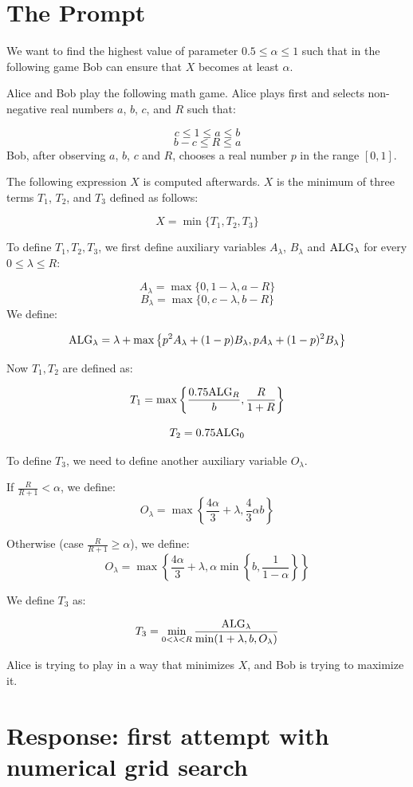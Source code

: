 \documentclass[11pt]{article}
\newcommand{\ALG}{\textnormal{ALG}}
\begin{document}
\section{The Prompt}
We want to find the highest value of parameter $0.5 \le \alpha \le 1$ such that in the following game Bob can ensure that $X$ becomes at least $\alpha$.

Alice and Bob play the following math game. Alice plays first and selects non-negative real numbers $a$, $b$, $c$, and $R$ such that:

$$c \le 1 \le a \le b$$
$$b-c \le R \le a$$
Bob, after observing $a$, $b$, $c$ and $R$, chooses a real number $p$ in the range $[0,1]$.

The following expression $X$ is computed afterwards. $X$ is the minimum of three terms $T_1$, $T_2$, and $T_3$ defined as follows:

$$X = \min\{T_1, T_2, T_3\}$$

To define $T_1, T_2, T_3$, we first define auxiliary variables $A_{\lambda}$, $B_{\lambda}$ and $\ALG_{\lambda}$ for every $0 \le \lambda \le R$:

$$A_{\lambda} = \max\{0, 1 - \lambda, a - R\}$$
$$B_{\lambda} = \max\{0, c - \lambda, b - R\}$$
We define:

$$\ALG_{\lambda} = \lambda + \max\left\{p^2A_{\lambda} + (1-p)B_{\lambda}, pA_{\lambda} + (1-p)^2B_{\lambda}\right\}$$

Now $T_1, T_2$ are defined as:


$$T_1 = \max\left\{\frac{0.75 \ALG_{R}}{b}, \frac{R}{1+R}\right\}$$

$$T_2 = 0.75 \ALG_{0}$$

To define $T_3$, we need to define another auxiliary variable $O_{\lambda}$.

If $\frac{R}{R+1} < \alpha$, we define:
$$O_{\lambda} = \max\left\{\frac{4 \alpha}{3} + \lambda, \frac{4}{3} \alpha b \right\}$$

Otherwise (case $\frac{R}{R+1} \ge \alpha$), we define:
$$O_{\lambda} = \max\left\{\frac{4 \alpha}{3} + \lambda, \alpha \min\left\{b, \frac{1}{1-\alpha} \right\} \right\}$$


We define $T_3$ as:

$$T_3 = \min_{0 < \lambda < R} \frac{\ALG_{\lambda}}{\min(1+\lambda, b, O_{\lambda})}$$

Alice is trying to play in a way that minimizes $X$, and Bob is trying to maximize it.

\section{Response: first attempt with numerical grid search}
\end{document}
